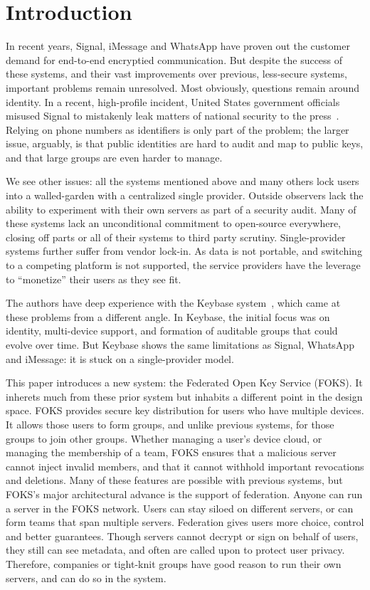 
\section{Introduction}

In recent years, Signal, iMessage and WhatsApp have proven out the customer
demand for end-to-end encryptied communication. But despite the success of these
systems, and their vast improvements over previous, less-secure systems,
important problems remain unresolved.  Most obviously, questions remain around
identity. In a recent, high-profile incident, United States government officials
misused Signal to mistakenly leak matters of national security to the
press~\cite{signal-hesgeth-leak}. Relying on phone numbers as identifiers is
only part of the problem; the larger issue, arguably, is that public identities
are hard to audit and map to public keys, and that large groups are even harder
to manage.

We see other issues: all the systems mentioned above and many others lock users
into a walled-garden with a centralized single provider. Outside observers lack
the ability to experiment with their own servers as part of a security audit.
Many of these systems lack an unconditional commitment to open-source
everywhere, closing off parts or all of their systems to third party scrutiny. 
Single-provider systems further suffer from vendor lock-in. As data is not
portable, and switching to a competing platform is not supported, the service
providers have the leverage to ``monetize'' their users as they see fit.

The authors have deep experience with the Keybase system~\cite{keybase}, which
came at these problems from a different angle. In Keybase, the initial focus was
on identity, multi-device support, and formation of auditable groups that could
evolve over time. But Keybase shows the same limitations as Signal, WhatsApp and
iMessage: it is stuck on a single-provider model.

This paper introduces a new system: the Federated Open Key Service (FOKS).  It
inherets much from these prior system but inhabits a different point in the
design space. FOKS provides secure key distribution for users who have multiple
devices. It allows those users to form groups, and unlike previous systems, for
those groups to join other groups. Whether managing a user's device cloud, or
managing the membership of a team, FOKS ensures that a malicious server cannot
inject invalid members, and that it cannot withhold important revocations and
deletions.  Many of these features are possible with previous systems, but
FOKS's major architectural advance is the support of federation. Anyone
can run a server in the FOKS network. Users can stay siloed on different
servers, or can form teams that span multiple servers. Federation gives users
more choice, control and better guarantees. Though servers cannot decrypt or
sign on behalf of users, they still can see metadata, and often are called upon
to protect user privacy. Therefore, companies or tight-knit groups have
good reason to run their own servers, and can do so in the system.

